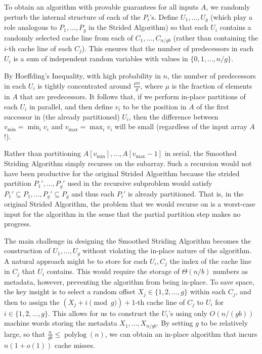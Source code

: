 \documentclass[sigconf, 10pt, nonacm]{acmart}
\renewcommand{\paragraph}[1]{\vspace{0.09in}\noindent{\bf \boldmath #1.}}
\theoremstyle{remark}
\theoremstyle{remark}
\begin{document}
\paragraph{The Smoothed Striding Algorithm}
To obtain an algorithm with provable guarantees for all inputs $A$, we
randomly perturb the internal structure of each of the $P_i$'s. Define
$U_1, \ldots, U_{g}$ (which play a role analogous to $P_1,
\ldots, P_g$ in the Strided Algorithm) so that each $U_i$ contains a
randomly selected cache line from each of $C_1, \ldots, C_{n /
  gb}$ (rather than containing the $i$-th cache line of each
$C_j$). This ensures that the number of predecessors in each $U_i$ is
a sum of independent random variables with values in $\{0, 1, \ldots,
n/g\}$.

By Hoeffding's Inequality, with high probability in $n$, the number of
predecessors in each $U_i$ is tightly concentrated around $\frac{\mu
  n}{g}$, where $\mu$ is the fraction of elements in $A$ that are
predecessors. It follows that, if we perform in-place partitions of
each $U_i$ in parallel, and then define $v_i$ to be the position in
$A$ of the first successor in (the already partitioned) $U_i$, then
the difference between $v_{\text{min}} = \min_i v_i$ and
$v_{\text{max}} = \max_i v_i$ will be small (regardless of the input array
$A$!).

Rather than partitioning $A[v_{\text{min}}],\ldots,
A[v_{\text{max}}-1]$ in serial, the Smoothed Striding Algorithm simply
recurses on the subarray. Such a recursion would not have been
productive for the original Strided Algorithm because the strided
partition $P_1', \ldots, P_g'$ used in the recursive subproblem would
satisfy $P_1' \subseteq P_1, \ldots, P_g' \subseteq P_g$ and thus each
$P_i'$ is already partitioned. That is, in the original Strided
Algorithm, the problem that we would recurse on is a worst-case input
for the algorithm in the sense that the partial partition step makes
no progress.


The main challenge in designing the Smoothed Striding Algorithm
becomes the construction of $U_1, \ldots, U_{g}$ without
violating the in-place nature of the algorithm. A natural approach
might be to store for each $U_i, C_j$ the index of the cache
line in $C_j$ that $U_i$ contains. This would require the storage of
$\Theta(n / b)$ numbers as metadata, however, preventing the algorithm
from being in-place. To save space, the key insight is to select a
random offset $X_j \in \{1, 2, \ldots, g\}$ within each $C_j$, and
then to assign the $(X_j + i \pmod g) + 1$-th cache line of $C_j$ to
$U_i$ for $i \in \{1, 2, \ldots, g\}$. This allows for us to construct
the $U_i$'s using only $O(n/(gb))$ machine words
storing the metadata $X_1, \ldots, X_{n / gb}$. By setting $g$ to
be relatively large, so that $\frac{n}{gb} \le
\operatorname{polylog}(n)$, we can obtain an in-place algorithm that
incurs $n (1 + o(1))$ cache misses.
\end{document}
